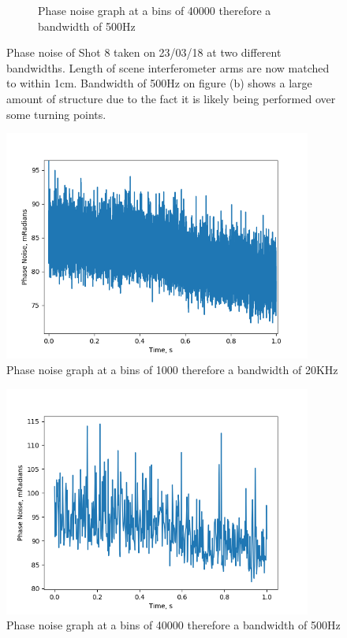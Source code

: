 \documentclass[12pt,a4paper,oneside]{report}
\begin{document}
\begin{figure}
\begin{subfigure}{.5\textwidth}
    \caption{Phase noise graph at a bins of 40000 therefore a bandwidth of 500Hz}
  \end{subfigure}
\caption{Phase noise of Shot 8 taken on 23/03/18 at two different bandwidths. Length of scene interferometer arms are now matched to within 1cm. Bandwidth of 500Hz on figure (b) shows a large amount of structure due to the fact it is likely being performed over some turning points.}
\label{fig:2-PN-shot-2-20180323-bw-1000-40000-matched}
\end{figure}

\begin{figure}[H] 
\includegraphics[width=0.9\textwidth, center,angle=0]{DImages/Phase_Noise_for_Scene_shot_2_with_bandwidth___1000_Date_20180323.png}
\caption{Phase noise graph at a bins of 1000 therefore a bandwidth of 20KHz}
\label{fig:PN-shot-2-20180323-bw-1000}
\end{figure}

\begin{figure}[H] 
\includegraphics[width=0.9\textwidth, center,angle=0]{DImages/Phase_Noise_for_Scene_shot_2_with_bandwidth___40000_Date_20180323.png}
\caption{Phase noise graph at a bins of 40000 therefore a bandwidth of 500Hz}
\label{fig:PN-shot-2-20180323-bw-40000}
\end{figure}
\end{document}

